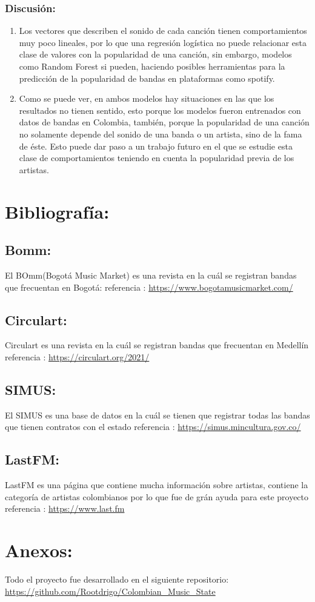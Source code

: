 \documentclass[11pt]{article}
\begin{document}
\subsubsection{Discusión:}
\label{sec:org9c7fa8e}
\begin{enumerate}
\item Los vectores que describen el sonido de cada canción tienen comportamientos muy poco lineales, por lo que una regresión logística no puede relacionar esta clase de valores con la popularidad de una canción, sin embargo, modelos como Random Forest si pueden, haciendo posibles herramientas para la predicción de la popularidad de bandas en plataformas como spotify.
\item Como se puede ver, en ambos modelos hay situaciones en las que los resultados no tienen sentido, esto porque los modelos fueron entrenados con datos de bandas en Colombia, también, porque la popularidad de una canción no solamente depende del sonido de una banda o un artista, sino de la fama de éste. Esto puede dar paso a un trabajo futuro en el que se estudie esta clase de comportamientos teniendo en cuenta la popularidad previa de los artistas.
\end{enumerate}




\section{Bibliografía:}
\label{sec:org2ca8dea}
\subsection{Bomm:}
\label{sec:org2917d1a}
El BOmm(Bogotá Music Market) es una revista en la cuál se registran bandas que
frecuentan en Bogotá: referencia : \url{https://www.bogotamusicmarket.com/}
\subsection{Circulart:}
\label{sec:org90747ed}
Circulart es una revista en la cuál se registran bandas que frecuentan en
Medellín referencia :  \url{https://circulart.org/2021/}
\subsection{SIMUS:}
\label{sec:org15a7f0b}
El SIMUS es una base de datos en la cuál se tienen que registrar todas las
bandas que tienen contratos con el estado referencia :
\url{https://simus.mincultura.gov.co/}
\subsection{LastFM:}
\label{sec:org4ee4ccb}
LastFM es una página que contiene mucha información sobre artistas, contiene la
categoría de artistas colombianos por lo que fue de grán ayuda para este
proyecto referencia : \url{https://www.last.fm}

\section{Anexos:}
\label{sec:org9872775}

Todo el proyecto fue desarrollado en el siguiente repositorio:
\url{https://github.com/Rootdrigo/Colombian\_Music\_State}
\end{document}
